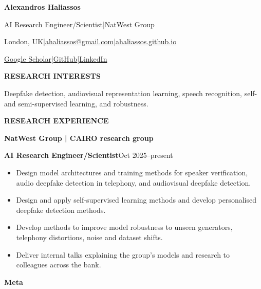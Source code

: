 \documentclass[10pt,a4paper]{article}
\newcommand{\cvsection}[1]{%
  \par\addvspace{14pt}%
  {\color{navy}\fontsize{10.5}{13}\selectfont\bfseries\MakeUppercase{#1}\par}%
  \nobreak\vspace{3pt}{\color{rule}\hrule height 0.45pt}%
  \nobreak\vspace{8pt}}
\newcommand{\organisation}[1]{%
  {\fontsize{12}{15}\selectfont\bfseries #1\par}\nobreak\vspace{3pt}}
\newcommand{\dated}[2]{%
  {\bfseries #1}\hfill{\fontsize{9.5}{12}\selectfont\color{muted}#2}\par\nobreak}
\newcommand{\appointment}[2]{\dated{#1}{#2}}
\newcommand{\entrygap}{\par\vspace{7pt}}
\begin{document}
\color{ink}\fontsize{10.5}{13.5}\selectfont
{\color{navy}\fontsize{27}{31}\selectfont\bfseries Alexandros Haliassos\par}
\vspace{5pt}
{\fontsize{11}{14}\selectfont AI Research Engineer/Scientist\quad|\quad NatWest Group\par}
\vspace{6pt}
{\fontsize{9.5}{12}\selectfont London, UK\quad|\quad\href{mailto:ahaliassos@gmail.com}{ahaliassos@gmail.com}\quad|\quad\href{https://ahaliassos.github.io}{ahaliassos.github.io}\par}
\vspace{3pt}
{\fontsize{9.5}{12}\selectfont \href{https://scholar.google.com/citations?user=qejRKDYAAAAJ\&hl=en}{Google Scholar}\quad|\quad\href{https://github.com/ahaliassos}{GitHub}\quad|\quad\href{https://www.linkedin.com/in/alexandros-haliassos-692495150/}{LinkedIn}\par}

\cvsection{Research interests}
Deepfake detection, audiovisual representation learning, speech recognition, self- and semi-supervised learning, and robustness.\par
\cvsection{Research experience}
\organisation{NatWest Group | CAIRO research group}

\appointment{AI Research Engineer/Scientist}{Oct 2025--present}
\begin{itemize}
  \item Design model architectures and training methods for speaker verification, audio deepfake detection in telephony, and audiovisual deepfake detection.
  \item Design and apply self-supervised learning methods and develop personalised deepfake detection methods.
  \item Develop methods to improve model robustness to unseen generators, telephony distortions, noise and dataset shifts.
  \item Deliver internal talks explaining the group's models and research to colleagues across the bank.
\end{itemize}
\entrygap
\organisation{Meta}
\end{document}
